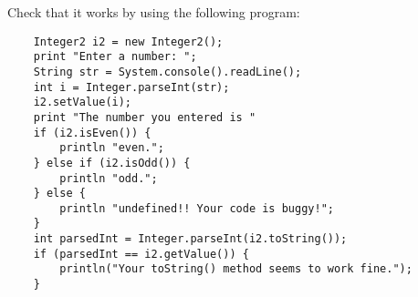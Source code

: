 \documentclass{article}
\begin{document}
Check that it works by using the following program: 

\begin{verbatim}
    Integer2 i2 = new Integer2();
    print "Enter a number: ";
    String str = System.console().readLine();
    int i = Integer.parseInt(str);
    i2.setValue(i);
    print "The number you entered is " 
    if (i2.isEven()) {
        println "even.";
    } else if (i2.isOdd()) {
        println "odd.";
    } else {
        println "undefined!! Your code is buggy!";
    }
    int parsedInt = Integer.parseInt(i2.toString());
    if (parsedInt == i2.getValue()) {
        println("Your toString() method seems to work fine.");
    }
\end{verbatim}
\end{document}
